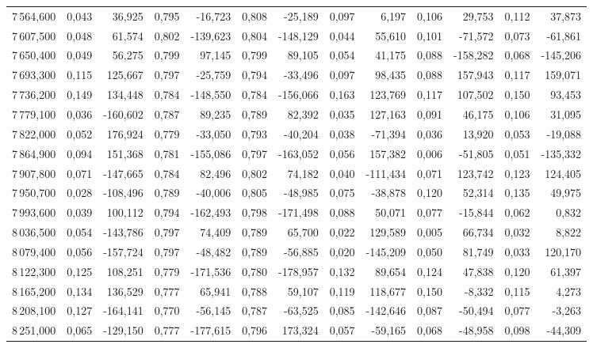 \begin{longtable}{rrrrrrrrrrrrr}
7\,564,600 & 0,043 & 36,925 & 0,795 & -16,723 & 0,808 & -25,189 & 0,097 & 6,197 & 0,106 & 29,753 & 0,112 & 37,873\\
7\,607,500 & 0,048 & 61,574 & 0,802 & -139,623 & 0,804 & -148,129 & 0,044 & 55,610 & 0,101 & -71,572 & 0,073 & -61,861\\
7\,650,400 & 0,049 & 56,275 & 0,799 & 97,145 & 0,799 & 89,105 & 0,054 & 41,175 & 0,088 & -158,282 & 0,068 & -145,206\\
7\,693,300 & 0,115 & 125,667 & 0,797 & -25,759 & 0,794 & -33,496 & 0,097 & 98,435 & 0,088 & 157,943 & 0,117 & 159,071\\
7\,736,200 & 0,149 & 134,448 & 0,784 & -148,550 & 0,784 & -156,066 & 0,163 & 123,769 & 0,117 & 107,502 & 0,150 & 93,453\\
7\,779,100 & 0,036 & -160,602 & 0,787 & 89,235 & 0,789 & 82,392 & 0,035 & 127,163 & 0,091 & 46,175 & 0,106 & 31,095\\
7\,822,000 & 0,052 & 176,924 & 0,779 & -33,050 & 0,793 & -40,204 & 0,038 & -71,394 & 0,036 & 13,920 & 0,053 & -19,088\\
7\,864,900 & 0,094 & 151,368 & 0,781 & -155,086 & 0,797 & -163,052 & 0,056 & 157,382 & 0,006 & -51,805 & 0,051 & -135,332\\
7\,907,800 & 0,071 & -147,665 & 0,784 & 82,496 & 0,802 & 74,182 & 0,040 & -111,434 & 0,071 & 123,742 & 0,123 & 124,405\\
7\,950,700 & 0,028 & -108,496 & 0,789 & -40,006 & 0,805 & -48,985 & 0,075 & -38,878 & 0,120 & 52,314 & 0,135 & 49,975\\
7\,993,600 & 0,039 & 100,112 & 0,794 & -162,493 & 0,798 & -171,498 & 0,088 & 50,071 & 0,077 & -15,844 & 0,062 & 0,832\\
8\,036,500 & 0,054 & -143,786 & 0,797 & 74,409 & 0,789 & 65,700 & 0,022 & 129,589 & 0,005 & 66,734 & 0,032 & 8,822\\
8\,079,400 & 0,056 & -157,724 & 0,797 & -48,482 & 0,789 & -56,885 & 0,020 & -145,209 & 0,050 & 81,749 & 0,033 & 120,170\\
8\,122,300 & 0,125 & 108,251 & 0,779 & -171,536 & 0,780 & -178,957 & 0,132 & 89,654 & 0,124 & 47,838 & 0,120 & 61,397\\
8\,165,200 & 0,134 & 136,529 & 0,777 & 65,941 & 0,788 & 59,107 & 0,119 & 118,677 & 0,150 & -8,332 & 0,115 & 4,273\\
8\,208,100 & 0,127 & -164,141 & 0,770 & -56,145 & 0,787 & -63,525 & 0,085 & -142,646 & 0,087 & -50,494 & 0,077 & -3,263\\
8\,251,000 & 0,065 & -129,150 & 0,777 & -177,615 & 0,796 & 173,324 & 0,057 & -59,165 & 0,068 & -48,958 & 0,098 & -44,309\\

\end{longtable}
